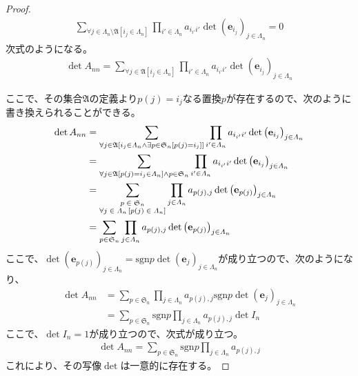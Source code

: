 \documentclass[dvipdfmx]{jsarticle}
\begin{document}
\begin{proof}
\begin{align*}
\sum_{\forall j \in \varLambda_{n}\mathfrak{\setminus A}\left[ i_{j} \in \varLambda_{n} \right]} {\prod_{i' \in \varLambda_{n}} a_{i_{i'}i'}\det\left( \mathbf{e}_{i_{j}} \right)_{j \in \varLambda_{n}}} = 0
\end{align*}
次式のようになる。
\begin{align*}
\det A_{nn} = \sum_{\forall j \in \mathfrak{A}\left[ i_{j} \in \varLambda_{n} \right]} {\prod_{i' \in \varLambda_{n}} a_{i_{i'}i'}\det\left( \mathbf{e}_{i_{j}} \right)_{j \in \varLambda_{n}}}
\end{align*}\par
ここで、その集合$\mathfrak{A}$の定義より$p(j) = i_{j}$なる置換$p$が存在するので、次のように書き換えられることができる。
\begin{align*}
\det A_{nn} &= \sum_{\forall j \in \mathfrak{A}\left[ i_{j} \in \varLambda_{n} \land \exists p \in \mathfrak{S}_{n}\left[ p(j) = i_{j} \right] \right]} {\prod_{i' \in \varLambda_{n}} a_{i_{i'}i'}\det\left( \mathbf{e}_{i_{j}} \right)_{j \in \varLambda_{n}}}\\
&= \sum_{\forall j \in \mathfrak{A}\left[ p(j) = i_{j} \in \varLambda_{n} \right] \land p \in \mathfrak{S}_{n}} {\prod_{i' \in \varLambda_{n}} a_{i_{i'}i'}\det\left( \mathbf{e}_{i_{j}} \right)_{j \in \varLambda_{n}}}\\
&= \sum_{\scriptsize \begin{matrix}
p \in \mathfrak{S}_{n} \\
\forall j \in \varLambda_{n}\left[ p(j) \in \varLambda_{n} \right] \\
\end{matrix}} {\prod_{j \in \varLambda_{n}} a_{p(j),j}\det\left( \mathbf{e}_{p(j)} \right)_{j \in \varLambda_{n}}}\\
&= \sum_{p \in \mathfrak{S}_{n}} {\prod_{j \in \varLambda_{n}} a_{p(j),j}\det\left( \mathbf{e}_{p(j)} \right)_{j \in \varLambda_{n}}}
\end{align*}
ここで、$\det\left( \mathbf{e}_{p(j)} \right)_{j \in \varLambda_{n}} = {\mathrm{sgn} }p\det\left( \mathbf{e}_{j} \right)_{j \in \varLambda_{n}}$が成り立つので、次のようになり、
\begin{align*}
\det A_{nn} &= \sum_{p \in \mathfrak{S}_{n}} {\prod_{j \in \varLambda_{n}} a_{p(j),j}{\mathrm{sgn} }p\det\left( \mathbf{e}_{j} \right)_{j \in \varLambda_{n}}}\\
&= \sum_{p \in \mathfrak{S}_{n}} {{\mathrm{sgn} }p\prod_{j \in \varLambda_{n}} a_{p(j),j}\det I_{n}}
\end{align*}
ここで、$\det I_{n} = 1$が成り立つので、次式が成り立つ。
\begin{align*}
\det A_{nn} = \sum_{p \in \mathfrak{S}_{n}} {{\mathrm{sgn} }p\prod_{j \in \varLambda_{n}} a_{p(j),j}}
\end{align*}
これにより、その写像$\det$は一意的に存在する。
\end{proof}
\end{document}
